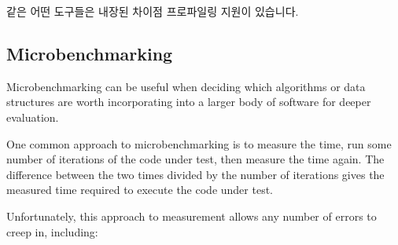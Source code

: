  같은 어떤 도구들은 내장된 차이점 프로파일링 지원이 있습니다.

\subsection{Microbenchmarking}
\label{sec:debugging:Microbenchmarking}

Microbenchmarking can be useful when deciding which algorithms or
data structures are worth incorporating into a larger body of software
for deeper evaluation.

One common approach to microbenchmarking is to measure the time,
run some number of iterations of the code
under test, then measure the time again.
The difference between the two times divided by the number of iterations
gives the measured time required to execute the code under test.

Unfortunately, this approach to measurement allows any number of errors
to creep in, including:

